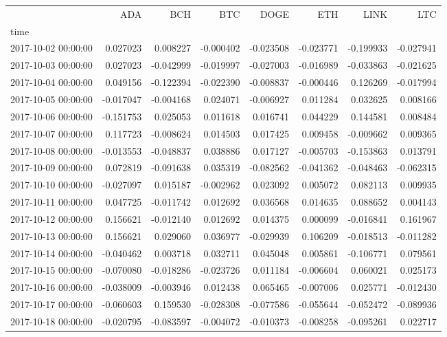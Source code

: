 \begin{tabular}{lrrrrrrr}
\toprule
 & ADA & BCH & BTC & DOGE & ETH & LINK & LTC \\
time &  &  &  &  &  &  &  \\
\midrule
2017-10-02 00:00:00 & 0.027023 & 0.008227 & -0.000402 & -0.023508 & -0.023771 & -0.199933 & -0.027941 \\
2017-10-03 00:00:00 & 0.027023 & -0.042999 & -0.019997 & -0.027003 & -0.016989 & -0.033863 & -0.021625 \\
2017-10-04 00:00:00 & 0.049156 & -0.122394 & -0.022390 & -0.008837 & -0.000446 & 0.126269 & -0.017994 \\
2017-10-05 00:00:00 & -0.017047 & -0.004168 & 0.024071 & -0.006927 & 0.011284 & 0.032625 & 0.008166 \\
2017-10-06 00:00:00 & -0.151753 & 0.025053 & 0.011618 & 0.016741 & 0.044229 & 0.144581 & 0.008484 \\
2017-10-07 00:00:00 & 0.117723 & -0.008624 & 0.014503 & 0.017425 & 0.009458 & -0.009662 & 0.009365 \\
2017-10-08 00:00:00 & -0.013553 & -0.048837 & 0.038886 & 0.017127 & -0.005703 & -0.153863 & 0.013791 \\
2017-10-09 00:00:00 & 0.072819 & -0.091638 & 0.035319 & -0.082562 & -0.041362 & -0.048463 & -0.062315 \\
2017-10-10 00:00:00 & -0.027097 & 0.015187 & -0.002962 & 0.023092 & 0.005072 & 0.082113 & 0.009935 \\
2017-10-11 00:00:00 & 0.047725 & -0.011742 & 0.012692 & 0.036568 & 0.014635 & 0.088652 & 0.004143 \\
2017-10-12 00:00:00 & 0.156621 & -0.012140 & 0.012692 & 0.014375 & 0.000099 & -0.016841 & 0.161967 \\
2017-10-13 00:00:00 & 0.156621 & 0.029060 & 0.036977 & -0.029939 & 0.106209 & -0.018513 & -0.011282 \\
2017-10-14 00:00:00 & -0.040462 & 0.003718 & 0.032711 & 0.045048 & 0.005861 & -0.106771 & 0.079561 \\
2017-10-15 00:00:00 & -0.070080 & -0.018286 & -0.023726 & 0.011184 & -0.006604 & 0.060021 & 0.025173 \\
2017-10-16 00:00:00 & -0.038009 & -0.003946 & 0.012438 & 0.065465 & -0.007006 & 0.025771 & -0.012430 \\
2017-10-17 00:00:00 & -0.060603 & 0.159530 & -0.028308 & -0.077586 & -0.055644 & -0.052472 & -0.089936 \\
2017-10-18 00:00:00 & -0.020795 & -0.083597 & -0.004072 & -0.010373 & -0.008258 & -0.095261 & 0.022717 \\

\end{tabular}
